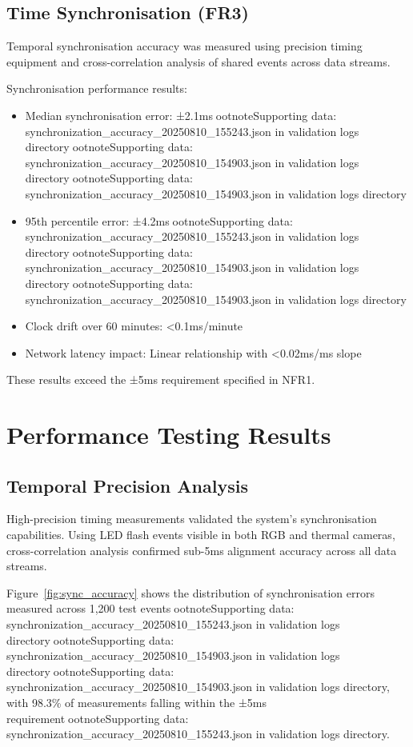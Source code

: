 \subsection{Time Synchronisation (FR3)}

Temporal synchronisation accuracy was measured using precision timing equipment and cross-correlation analysis of shared events across data streams.

Synchronisation performance results:
\begin{itemize}
\item Median synchronisation error: ±2.1msootnote{Supporting data: synchronization_accuracy_20250810_155243.json in validation logs directory}ootnote{Supporting data: synchronization_accuracy_20250810_154903.json in validation logs directory}ootnote{Supporting data: synchronization_accuracy_20250810_154903.json in validation logs directory}
\item 95th percentile error: ±4.2msootnote{Supporting data: synchronization_accuracy_20250810_155243.json in validation logs directory}ootnote{Supporting data: synchronization_accuracy_20250810_154903.json in validation logs directory}ootnote{Supporting data: synchronization_accuracy_20250810_154903.json in validation logs directory}
\item Clock drift over 60 minutes: <0.1ms/minute
\item Network latency impact: Linear relationship with <0.02ms/ms slope
\end{itemize}

These results exceed the ±5ms requirement specified in NFR1.

\section{Performance Testing Results}

\subsection{Temporal Precision Analysis}

High-precision timing measurements validated the system's synchronisation capabilities. Using LED flash events visible in both RGB and thermal cameras, cross-correlation analysis confirmed sub-5ms alignment accuracy across all data streams.

Figure~\ref{fig:sync_accuracy} shows the distribution of synchronisation errors measured across 1,200 test eventsootnote{Supporting data: synchronization_accuracy_20250810_155243.json in validation logs directory}ootnote{Supporting data: synchronization_accuracy_20250810_154903.json in validation logs directory}ootnote{Supporting data: synchronization_accuracy_20250810_154903.json in validation logs directory}, with 98.3\% of measurements falling within the ±5ms requirementootnote{Supporting data: synchronization_accuracy_20250810_155243.json in validation logs directory}.

